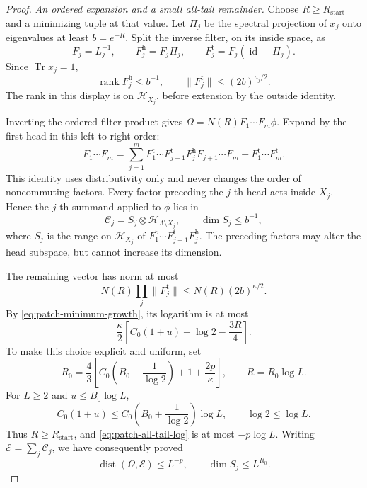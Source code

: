 \documentclass[11pt]{article}
\numberwithin{equation}{section}
\theoremstyle{definition}
\theoremstyle{remark}
\begin{document}
\begin{proof}
\emph{An ordered expansion and a small all-tail remainder.}
Choose \(R\geq R_{\mathrm{start}}\) and a minimizing tuple at
that value.  Let \(\Pi_j\) be the spectral projection of \(x_j\)
onto eigenvalues at least \(b=e^{-R}\).  Split the inverse filter,
on its inside space, as
\[
 F_j=L_j^{-1},\qquad
 F_j^{\mathrm h}=F_j\Pi_j,\qquad
 F_j^{\mathrm t}=F_j(\operatorname{id}-\Pi_j).
\]
Since \(\operatorname{Tr} x_j=1\),
\begin{equation}
 \operatorname{rank} F_j^{\mathrm h}\leq b^{-1},
 \qquad
 \lVert F_j^{\mathrm t}\rVert\leq(2b)^{a_j/2}.
 \label{eq:patch-head-tail-bounds}
\end{equation}
The rank in this display is on \(\mathcal H_{X_j}\), before
extension by the outside identity.

Inverting the ordered filter product gives
\(\Omega=N(R)F_1\cdots F_m\phi\).
Expand by the first head in this left-to-right order:
\begin{equation}
 F_1\cdots F_m
   =\sum_{j=1}^m
        F_1^{\mathrm t}\cdots F_{j-1}^{\mathrm t}
        F_j^{\mathrm h}F_{j+1}\cdots F_m
      +F_1^{\mathrm t}\cdots F_m^{\mathrm t}.
 \label{eq:patch-first-head-expansion}
\end{equation}
This identity uses distributivity only and never changes the order
of noncommuting factors.  Every factor preceding the \(j\)-th head
acts inside \(X_j\).  Hence the \(j\)-th summand applied to \(\phi\)
lies in
\[
 \mathcal C_j=S_j\otimes\mathcal H_{\Lambda\setminus X_j},
 \qquad
 \dim S_j\leq b^{-1},
\]
where \(S_j\) is the range on \(\mathcal H_{X_j}\) of
\(F_1^{\mathrm t}\cdots F_{j-1}^{\mathrm t}F_j^{\mathrm h}\).
The preceding factors may alter the head subspace, but cannot
increase its dimension.

The remaining vector has norm at most
\[
 N(R)\prod_j\lVert F_j^{\mathrm t}\rVert
       \leq N(R)(2b)^{\kappa/2}.
\]
By \eqref{eq:patch-minimum-growth}, its logarithm is at most
\begin{equation}
 \frac{\kappa}{2}
       \left[C_0(1+u)+\log2-\frac{3R}{4}\right].
 \label{eq:patch-all-tail-log}
\end{equation}
To make this choice explicit and uniform, set
\begin{equation}
 R_0=\frac43\left[
           C_0\left(B_0+\frac1{\log2}\right)
                 +1+\frac{2p}{\kappa}\right],
 \qquad R=R_0\log L.
 \label{eq:patch-explicit-radius}
\end{equation}
For \(L\geq2\) and \(u\leq B_0\log L\),
\[
 C_0(1+u)\leq
       C_0\left(B_0+\frac1{\log2}\right)\log L,
 \qquad \log2\leq\log L.
\]
Thus \(R\geq R_{\mathrm{start}}\), and
\eqref{eq:patch-all-tail-log} is at most \(-p\log L\).
Writing \(\mathcal E=\sum_j\mathcal C_j\), we have consequently
proved
\begin{equation}
 \operatorname{dist}(\Omega,\mathcal E)\leq L^{-p},
 \qquad
 \dim S_j\leq L^{R_0}.
 \label{eq:patch-distance-to-cylinders}
\end{equation}


\end{proof}
\end{document}
